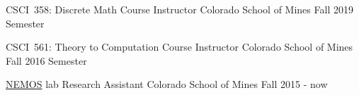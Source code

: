 

\begin{cventries}
	
	\cventry
	{CSCI~358: Discrete Math} %
	{Course Instructor} %
	{Colorado School of Mines} %
	{Fall 2019 Semester} %
	{}

	\cventry
	{CSCI~561: Theory to Computation} %
	{Course Instructor} %
	{Colorado School of Mines} %
	{Fall 2016 Semester} %
	{}
	
	\hspace{-2mm}
	\cventry
	{\href{http://nemos.mines.edu}{NEMOS} lab} %
	{Research Assistant} %
	{Colorado School of Mines} %
	{Fall 2015 - now} %
	{}
	
\end{cventries}
